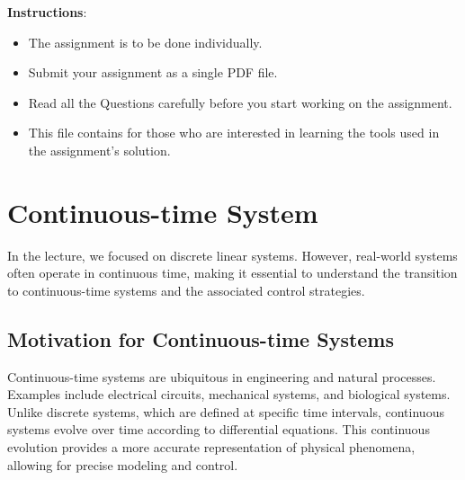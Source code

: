 \documentclass[a4 paper]{article}
\begin{document}
\textbf{Instructions}: 
\begin{itemize}
    \item The assignment is to be done individually.
    \item Submit your assignment as a single PDF file.
    \item Read all the Questions carefully before you start working on the assignment.
    \item This file contains  for those who are interested in learning the tools used in the 
        assignment's solution. 
\end{itemize}

\section{Continuous-time System}

In the lecture, we focused on discrete linear systems. However, real-world systems often operate in continuous time, 
making it essential to understand the transition to continuous-time systems and the associated control strategies.

\subsection{Motivation for Continuous-time Systems}
Continuous-time systems are ubiquitous in engineering and natural processes. Examples include electrical circuits, 
mechanical systems, and biological systems. Unlike discrete systems, which are defined at specific time intervals, 
continuous systems evolve over time according to differential equations. This continuous evolution provides a more 
accurate representation of physical phenomena, allowing for precise modeling and control.
\end{document}
